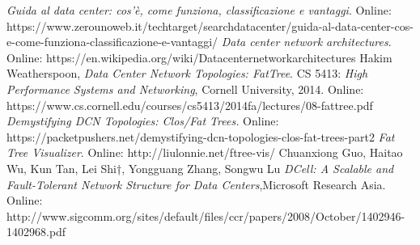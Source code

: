 \documentclass[]{article}
\begin{document}
\begin{thebibliography}{6}
	\emph{Guida al data center: cos’è, come funziona, classificazione e vantaggi}.
	Online: https://www.zerounoweb.it/techtarget/searchdatacenter/guida-al-data-center-cos-e-come-funziona-classificazione-e-vantaggi/
	\textit{Data center network architectures}.
	Online: https://en.wikipedia.org/wiki/Data\textunderscore center\textunderscore network\textunderscore architectures
	Hakim Weatherspoon,
	\emph{Data Center Network Topologies: FatTree}.
	CS 5413: \emph{High Performance Systems and Networking}, Cornell University, 2014.
	Online:	https://www.cs.cornell.edu/courses/cs5413/2014fa/lectures/08-fattree.pdf
	\emph{Demystifying DCN Topologies: Clos/Fat Trees.}
	Online: https://packetpushers.net/demystifying-dcn-topologies-clos-fat-trees-part2
	\emph{Fat Tree Visualizer}.
	Online: http://liulonnie.net/ftree-vis/
	Chuanxiong Guo, Haitao Wu, Kun Tan, Lei Shi†, Yongguang Zhang, Songwu Lu
	\emph{DCell: A Scalable and Fault-Tolerant Network Structure for Data Centers},Microsoft Research Asia.
	Online: http://www.sigcomm.org/sites/default/files/ccr/papers/2008/October/1402946-1402968.pdf
	
\end{thebibliography}
\end{document}
